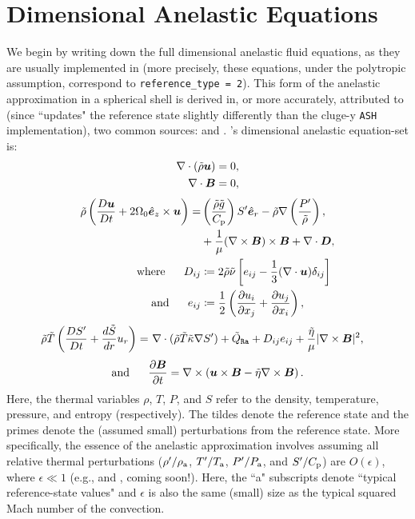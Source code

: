 \documentclass[12pt]{article}
\numberwithin{equation}{section}
\newcommand{\tmpa}{T_{\rm a}}
\newcommand{\rhoa}{\rho_{\rm a}}
\newcommand{\prsa}{P_{\rm a}}
\begin{document}
	\section{Dimensional Anelastic Equations}\label{sec:eqdim}
	We begin by writing down the full dimensional anelastic fluid equations, as they are usually implemented in {\rayleigh} (more precisely, these equations, under the polytropic assumption, correspond to \texttt{reference\_type = 2}). This form of the anelastic approximation in a spherical shell is derived in, or more accurately, attributed to (since {\rayleigh} ``updates" the reference state slightly differently than the cluge-y \texttt{ASH} implementation), two common sources: \citet{Gilman1981} and \citet{Clune1999}. {\rayleigh}'s dimensional anelastic equation-set is:
	\begin{align}
		\nabla\cdot(\tilde{\rho}\bm{u}) &= 0\label{eq:contdim},\\
		\nabla\cdot \bm{B} &= 0,
	\end{align}
	\begin{subequations}\label{eq:momdim}
	\begin{align}
		\tilde{\rho}\left(\frac{D\bm{u}}{Dt}+2\Omega_0\hat{\bm{e}}_z\times\bm{u}\right) = &  \left(\frac{\tilde{\rho} \tilde{g}}{C_{\rm{p}}}\right) {S^\prime}\hat{\bm{e}}_r-\tilde{\rho}\nabla\left( \frac{{P^\prime}}{\tilde{\rho}} \right), \nonumber\\
		&+ \frac{1}{\mu}(\nabla\times\bm{B})\times\bm{B}+\nabla\cdot\bm{D},\\
		\text{where}\ \ \ \ \  D_{ij} &\coloneqq 2\tilde{\rho}\tilde{\nu} \left[e_{ij} - \frac{1}{3}(\nabla\cdot\bm{u}) \delta_{ij} \right]\label{eq:dstressdim}\\
		\text{and}\ \ \ \ \  e_{ij} &\coloneqq \frac{1}{2}\left(\frac{\partial u_i}{\partial x_j} + \frac{\partial u_j}{\partial x_i} \right),\label{eq:estressdim}
	\end{align}
	\end{subequations}
	\begin{align}\label{eq:endim}
		\tilde{\rho}\tilde{T} \left(\frac{D{S^\prime}}{Dt} + \frac{d\tilde{S}}{dr} u_r\right) = &\ \nabla\cdot(\tilde{\rho} \tilde{T} \tilde{\kappa} \nabla {S^\prime}) +\tilde{Q}_{\texttt{Ra}}+ D_{ij}e_{ij} + \frac{\tilde{\eta}}{\mu}|\nabla\times\bm{B}|^2,
	\end{align}
	\begin{align}\label{eq:inddim}
	\text{and}\ \ \ \ \  \frac{\partial\bm{B}}{\partial t} = \nabla\times\left(\bm{u}\times\bm{B} - \tilde{\eta}\nabla\times\bm{B}\right).
	\end{align}
	Here, the thermal variables $\rho$, $T$, $P$, and $S$ refer to the density, temperature, pressure, and entropy (respectively). The tildes denote the reference state and the primes denote the (assumed small) perturbations from the reference state. More specifically, the essence of the anelastic approximation involves assuming all relative thermal perturbations ($\rhoprime/\rhoa$, $\tmpprime/\tmpa$, $\prsprime/\prsa$, and ${S^\prime}/C_{\rm{p}}$) are $O(\epsilon)$, where $\epsilon\ll1$ (e.g., \citealt{Ogura1962,Gough1969} and \citealt{Matilsky2024b}, coming soon!). Here, the ``a" subscripts denote ``typical reference-state values" and $\epsilon$ is also the same (small) size as the typical squared Mach number of the convection.
	
\end{document}
